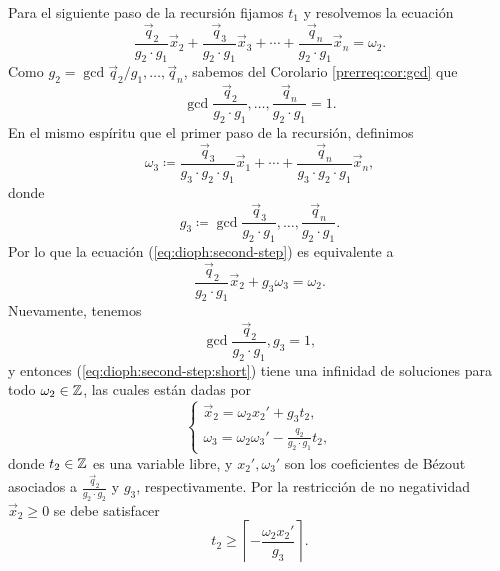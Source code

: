 Para el siguiente paso de la recursión fijamos $t_1$ y resolvemos la ecuación
\begin{equation}
	\label{eq:dioph:second-step}
	\frac{\vec{q}_2}{g_2 \cdot g_1}\vec{x}_2 +
	\frac{\vec{q}_3}{g_2 \cdot g_1}\vec{x}_3 +
	\cdots +
	\frac{\vec{q}_n}{g_2 \cdot g_1}\vec{x}_n
	= \omega_2.
\end{equation}
Como $g_2 = \gcd{\vec{q}_2/g_1, \ldots, \vec{q}_n}$, sabemos del Corolario \ref{prerreq:cor:gcd} que
\begin{equation*}
	\gcd{\frac{\vec{q}_2}{g_2 \cdot g_1}, \ldots, \frac{\vec{q}_n}{g_2 \cdot g_1}} = 1.
\end{equation*}
En el mismo espíritu que el primer paso de la recursión, definimos
\begin{equation*}
	\omega_3 \coloneq \frac{\vec{q}_3}{g_3 \cdot g_2 \cdot g_1}\vec{x}_1 + \cdots + \frac{\vec{q}_n}{g_3
	\cdot g_2 \cdot g_1}\vec{x}_n,
\end{equation*}
donde
\begin{equation*}
	g_3 \coloneq  \gcd{\frac{\vec{q}_3}{g_2 \cdot g_1}, \ldots, \frac{\vec{q}_n}{g_2 \cdot g_1}}.
\end{equation*}
Por lo que la ecuación (\ref{eq:dioph:second-step}) es equivalente a
\begin{equation}
	\label{eq:dioph:second-step:short}
	\frac{\vec{q}_2}{g_2 \cdot g_1}\vec{x}_2 + g_3\omega_3 = \omega_2.
\end{equation}
Nuevamente, tenemos
\begin{equation*}
	\gcd{\frac{\vec{q}_2}{g_2 \cdot g_1}, g_3} = 1,
\end{equation*}
y entonces (\ref{eq:dioph:second-step:short}) tiene una infinidad de soluciones para todo $\omega_2 \in
\mathbb{Z}$, las cuales están dadas por
\begin{equation*}
	\begin{cases}
		\vec{x}_2 = \omega_2x_2' + g_3t_2, \\
		\omega_3 = \omega_2\omega_3' - \frac{q_2}{g_2 \cdot g_1}t_2,
	\end{cases}
\end{equation*}
donde $t_2 \in \mathbb{Z}$ es una variable libre, y $x_2', \omega_3'$ son los coeficientes de Bézout
asociados a $\frac{\vec{q}_2}{g_2 \cdot g_2}$ y $g_3$, respectivamente. Por la restricción de no
negatividad $\vec{x}_2 \geq 0$ se debe satisfacer
\begin{equation*}
	t_2 \geq \left\lceil -\frac{\omega_2x_2'}{g_3} \right\rceil.
\end{equation*}

